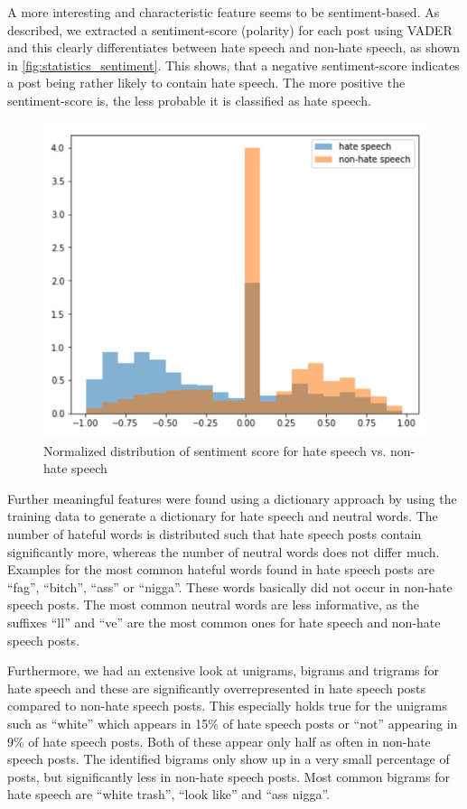 A more interesting and characteristic feature seems to be sentiment-based. As described, we extracted a sentiment-score (polarity) for each post using VADER and this clearly differentiates between hate speech and non-hate speech, as shown in \autoref{fig:statistics_sentiment}.
This shows, that a negative sentiment-score indicates a post being rather likely to contain hate speech. The more positive the sentiment-score is, the less probable it is classified as hate speech.

\begin{figure}[ht]
	\centering
	\includegraphics[width=0.7\linewidth]{figures/statistics_sentiment.png}
	\caption{Normalized distribution of sentiment score for hate speech vs. non-hate speech}
	\label{fig:statistics_sentiment}
\end{figure}

Further meaningful features were found using a dictionary approach by using the training data to generate a dictionary for hate speech and neutral words. The number of hateful words is distributed such that hate speech posts contain significantly more, whereas the number of neutral words does not differ much.
Examples for the most common hateful words found in hate speech posts are \enquote{fag}, \enquote{bitch}, \enquote{ass} or \enquote{nigga}. These words basically did not occur in non-hate speech posts. The most common neutral words are less informative, as the suffixes \enquote{ll} and \enquote{ve} are the most common ones for hate speech and non-hate speech posts.

Furthermore, we had an extensive look at unigrams, bigrams and trigrams for hate speech and these are significantly overrepresented in hate speech posts compared to non-hate speech posts. This especially holds true for the unigrams such as \enquote{white} which appears in 15\% of hate speech posts or \enquote{not} appearing in 9\% of hate speech posts. Both of these appear only half as often in non-hate speech posts.
The identified bigrams only show up in a very small percentage of posts, but significantly less in non-hate speech posts. Most common bigrams for hate speech are \enquote{white trash}, \enquote{look like} and \enquote{ass nigga}.

